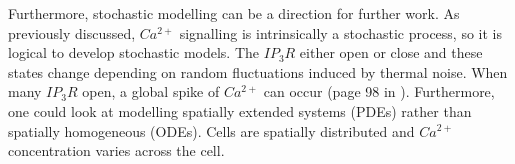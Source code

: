 Furthermore, stochastic modelling can be a direction for further work. As previously discussed, $Ca^{2+}$ signalling is intrinsically a stochastic process, so it is logical to develop stochastic models. The $IP_3R$ either open or close and these states change depending on random fluctuations induced by thermal noise. When many $IP_3R$ open, a global spike of $Ca^{2+}$ can occur (page 98 in ). Furthermore, one could look at modelling spatially extended systems (PDEs) rather than spatially homogeneous (ODEs). Cells are spatially distributed and $Ca^{2+}$ concentration varies across the cell.
